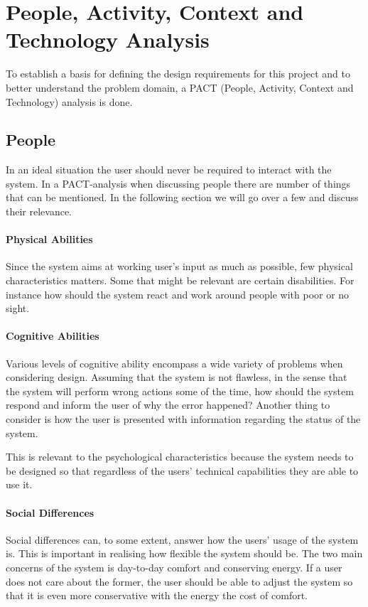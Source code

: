 \section{People, Activity, Context and Technology Analysis}
To establish a basis for defining the design requirements for this project and
to better understand the problem domain, a PACT (People, Activity, Context and Technology) analysis is done.

\subsection{People}
In an ideal situation the user should never be required to interact with the system. In a PACT-analysis when discussing people there are number of things that can be mentioned. In the following section we will go over a few and discuss their relevance.

\paragraph{Physical Abilities}
Since the system aims at working user's input as much as possible, few physical characteristics matters. Some that might be relevant are certain disabilities. For instance how should the system react and work around people with poor or no sight.

\paragraph{Cognitive Abilities}
Various levels of cognitive ability encompass a wide variety of problems
when considering design. Assuming that the system is not flawless, in the
  sense that the system will perform wrong actions some of the time, how should
the system respond and inform the user of why the error happened? Another thing
to consider is how the user is presented with information regarding the status
of the system.

This is relevant to the psychological characteristics because the system needs to be designed so that regardless of the users' technical capabilities they are able to use it.

\paragraph{Social Differences}
Social differences can, to some extent, answer how the users' usage of
the system is. This is important in realising how flexible the system should be.
The two main concerns of the system is day-to-day comfort and conserving energy.
If a user does not care about the former, the user should be able to adjust the system so that it is even more conservative with the energy the cost of comfort.

